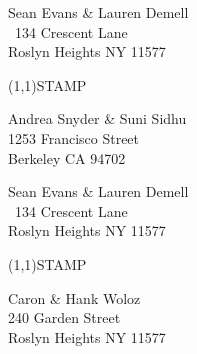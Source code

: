 \documentclass[12pt]{article}
\begin{document}
\begin{minipage}{.5\linewidth} \noindent
Sean Evans \& Lauren Demell\\\ 
134 Crescent Lane\\ 
Roslyn Heights NY 11577
\end{minipage}
\begin{minipage}{.5\linewidth \hspace{-.2in} \vspace{-.3in}}
\begin{flushright}
\framebox(1,1){STAMP}
\end{flushright}
\end{minipage}

\begin{center} \begin{Huge} \vspace*{\fill}
Andrea Snyder \& Suni Sidhu\\
1253 Francisco Street\\
Berkeley CA 94702\\
\vspace{\fill} \end{Huge} \end{center}

\clearpage

\begin{minipage}{.5\linewidth} \noindent
Sean Evans \& Lauren Demell\\\ 
134 Crescent Lane\\ 
Roslyn Heights NY 11577
\end{minipage}
\begin{minipage}{.5\linewidth \hspace{-.2in} \vspace{-.3in}}
\begin{flushright}
\framebox(1,1){STAMP}
\end{flushright}
\end{minipage}

\begin{center} \begin{Huge} \vspace*{\fill}
Caron \& Hank Woloz\\
240  Garden Street\\
Roslyn Heights NY 11577\\
\vspace{\fill} \end{Huge} \end{center}

\clearpage
\end{document}
